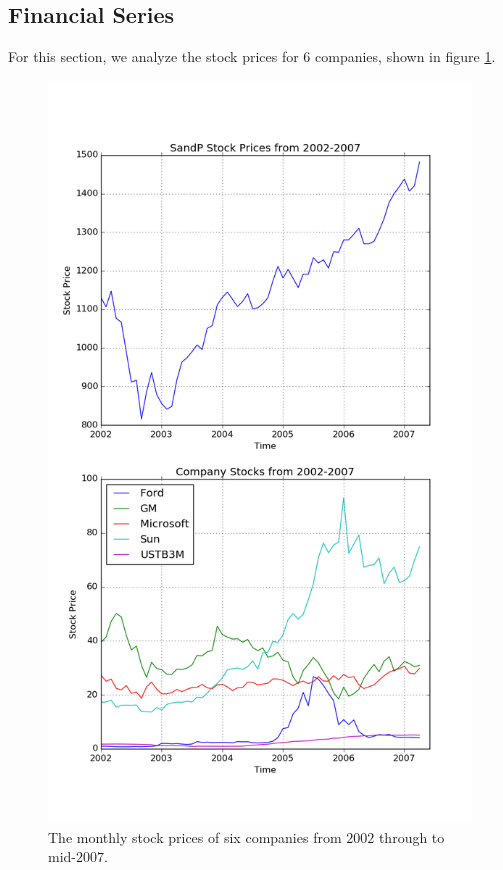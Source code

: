 \documentclass[twocolumn]{article}
\begin{document}
\subsection{Financial Series}
For this section, we analyze the stock prices for 6 companies, shown in figure
\ref{fig:stocks_time}.

\begin{figure}
  \includegraphics[width=\linewidth]{stocks_time.png}
  \caption{
    The monthly stock prices of six companies from $2002$ through to mid-$2007$.
  }
  \label{fig:stocks_time}
\end{figure}
\end{document}
